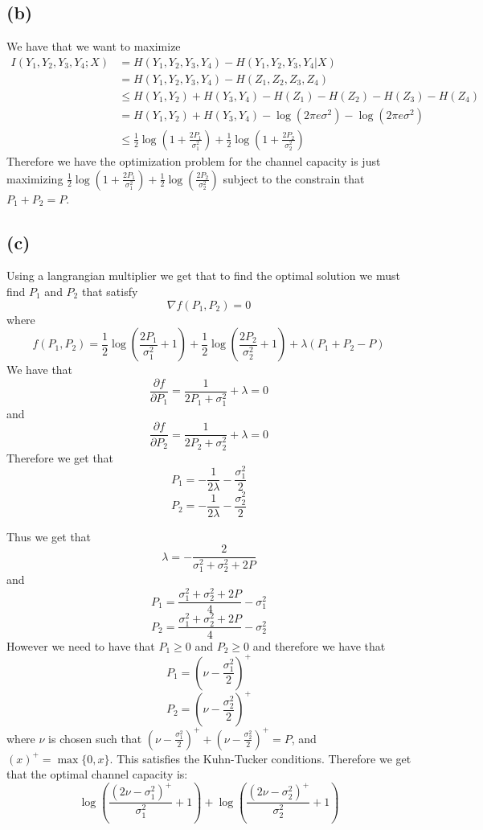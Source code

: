 \subsection*{(b)}
We have that we want to maximize 
\begin{align*}
    I(Y_1,Y_2,Y_3,Y_4;X)&=H(Y_1,Y_2,Y_3,Y_4)-H(Y_1,Y_2,Y_3,Y_4|X)\\
    &=H(Y_1,Y_2,Y_3,Y_4)-H(Z_1,Z_2,Z_3,Z_4)\\
    &\leq H(Y_1,Y_2)+H(Y_3,Y_4)-H(Z_1)-H(Z_2)-H(Z_3)-H(Z_4)\\
    &=H(Y_1,Y_2)+H(Y_3,Y_4)-\log(2\pi e\sigma^2)-\log(2\pi e\sigma^2)\\
    &\leq \frac{1}{2}\log\left(1+\frac{2P_1}{\sigma_1^2}\right)
    +\frac{1}{2}\log\left(1+\frac{2P_2}{\sigma_2^2}\right)
\end{align*}
Therefore we have the optimization problem for the channel capacity is just
maximizing $\frac{1}{2}\log\left(1+\frac{2P_1}{\sigma_1^2}\right)
+\frac{1}{2}\log\left(\frac{2P_2}{\sigma_2^2}\right)$ subject to 
the constrain that $P_1+P_2=P$.
\subsection*{(c)}
Using a langrangian multiplier we get that to find the optimal solution we must 
find $P_1$ and $P_2$ that satisfy 
$$\nabla f(P_1,P_2)=0$$
where 
$$f(P_1,P_2)=\frac{1}{2}\log\left(\frac{2P_1}{\sigma_1^2}+1\right)+\frac{1}{2}
\log\left(\frac{2P_2}{\sigma_2^2}+1\right)+\lambda(P_1+P_2-P)$$
We have that 
$$\frac{\partial f}{\partial P_1}=\frac{1}{2P_1+\sigma_1^2}+\lambda=0$$
and
$$\frac{\partial f}{\partial P_2}=\frac{1}{2P_2+\sigma_2^2}+\lambda=0$$
Therefore we get that 
$$P_1=-\frac{1}{2\lambda}-\frac{\sigma_1^2}{2}$$
$$P_2=-\frac{1}{2\lambda}-\frac{\sigma_2^2}{2}$$

Thus we get that 
$$\lambda=-\frac{2}{\sigma^2_1+\sigma^2_2+2P}$$
and
$$P_1=\frac{\sigma^2_1+\sigma^2_2+2P}{4}-\sigma_1^2$$
$$P_2=\frac{\sigma^2_1+\sigma^2_2+2P}{4}-\sigma_2^2$$
However we need to have that $P_1\geq 0$ and $P_2\geq 0$ and therefore we have that 
$$P_1=\boxed{\left(\nu-\frac{\sigma_1^2}{2}\right)^{+}}$$
$$P_2=\boxed{\left(\nu-\frac{\sigma_2^2}{2}\right)^{+}}$$
where $\nu$ is chosen such that $(\nu-\frac{\sigma_1^2}{2})^{+}+(\nu-\frac{\sigma_2^2}{2})^{+}=P$, and 
$(x)^{+}=\max\{0,x\}$. This satisfies the Kuhn-Tucker conditions. Therefore we get that
the optimal channel capacity is:
$$\boxed{\log\left(\frac{(2\nu-\sigma_1^2)^{+}}{\sigma_1^2}+1\right)+
\log\left(\frac{(2\nu-\sigma_2^2)^{+}}{\sigma_2^2}+1\right)}$$
